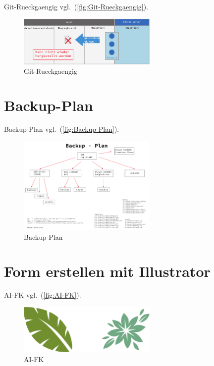 Git-Rueckgaengig vgl.~(\autoref{fig:Git-Rueckgaengig}).

\begin{figure}[!hb]%
\centering
\includegraphics[width=0.6\textwidth]{Grafiken/Git-Rueckgaengig.pdf}
\caption{Git-Rueckgaengig}
\label{fig:Git-Rueckgaengig}%
\end{figure}



\section{Backup-Plan}\label{backup-plan}

Backup-Plan vgl.~(\autoref{fig:Backup-Plan}).

\begin{figure}[!hb]%
\centering
\includegraphics[width=0.6\textwidth]{Grafiken/Backup-Plan.pdf}
\caption{Backup-Plan}
\label{fig:Backup-Plan}%
\end{figure}


\section{Form erstellen mit Illustrator}\label{}

AI-FK vgl.~(\autoref{fig:AI-FK}).

\begin{figure}[!hb]%
\centering
\includegraphics[width=0.6\textwidth]{Grafiken/AI-FK.pdf}
\caption{AI-FK}
\label{fig:AI-FK}%
\end{figure}

